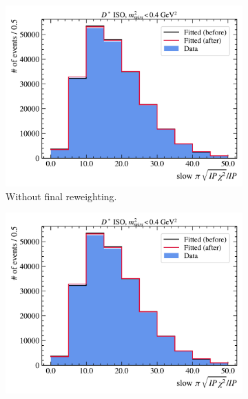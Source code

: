 \begin{figure}[htb]
    \begin{subfigure}[t]{0.32\textwidth}
        \centering
        \includegraphics[width=\textwidth]{./figs-mc-correction/reweighting-final/plot_step12-Dst_iso-spi_comp.pdf}
        \caption{Without final reweighting.}
        \label{fig:worse-pulls-after-final-rwt:no-final-rwt}
    \end{subfigure}
    \begin{subfigure}[t]{0.32\textwidth}
        \centering
        \includegraphics[width=\textwidth]{./figs-mc-correction/reweighting-final/plot_step12-Dst_iso-spi_comp.pdf}

\end{subfigure}
\end{figure}
